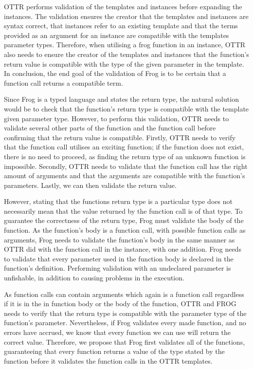OTTR performs validation of the templates and instances before expanding the instances. The validation ensures the creator that the templates and instances are syntax correct, that instances refer to an existing template and that the terms provided as an argument for an instance are compatible with the templates parameter types. Therefore, when utilising a frog function in an instance, OTTR also needs to ensure the creator of the templates and instances that the function's return value is compatible with the type of the given parameter in the template. In conclusion, the end goal of the validation of Frog is to be certain that a function call returns a compatible term. 

\para
Since Frog is a typed language and states the return type, the natural solution would be to check that the function's return type is compatible with the template given parameter type. However, to perform this validation, OTTR needs to validate several other parts of the function and the function call before confirming that the return value is compatible. Firstly, OTTR needs to verify that the function call utilises an exciting function; if the function does not exist, there is no need to proceed, as finding the return type of an unknown function is impossible. Secondly, OTTR needs to validate that the function call has the right amount of arguments and that the arguments are compatible with the function's parameters. Lastly, we can then validate the return value. 

\para
However, stating that the functions return type is a particular type does not necessarily mean that the value returned by the function call is of that type. To guarantee the correctness of the return type, Frog must validate the body of the function. As the function's body is a function call, with possible function calls as arguments, Frog needs to validate the function's body in the same manner as OTTR did with the function call in the instance, with one addition. Frog needs to validate that every parameter used in the function body is declared in the function's definition. Performing validation with an undeclared parameter is unfishable, in addition to causing problems in the execution. 

\para
As function calls can contain arguments which again is a function call regardless if it is in the in function body or the body of the function, OTTR and FROG needs to verify that the return type is compatible with the parameter type of the function's parameter. Nevertheless, if Frog validates every made function, and no errors have accrued, we know that every function we can use will return the correct value. Therefore, we propose that Frog first validates all of the functions, guaranteeing that every function returns a value of the type stated by the function before it validates the function calls in the OTTR templates. 


